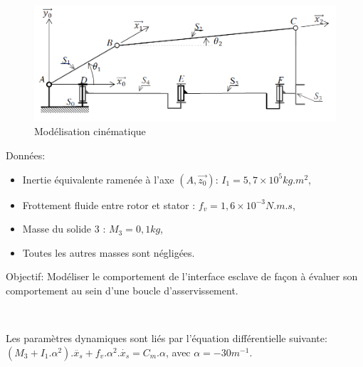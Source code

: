 \begin{figure}[ht!]
\begin{center}
 \includegraphics[width=0.9\linewidth]{img/Figure11}
\end{center}
\caption{Modélisation cinématique}
\label{fig11}
\end{figure}

Données:
\begin{itemize}
 \item Inertie	équivalente	ramenée	à l'axe $(A,\overrightarrow{z_0})$: $I_1=5,7\times 10^{5}kg.m^2$,
 \item Frottement fluide entre rotor et stator : $f_v = 1,6\times 10^{-3} N.m.s$,
 \item Masse du solide 3 : $M_3=0,1kg$,
 \item Toutes les autres masses sont négligées.
\end{itemize}

Objectif: Modéliser le comportement de l'interface esclave de façon à évaluer son comportement au sein d'une boucle d'asservissement.





~\

Les paramètres dynamiques sont liés par l'équation différentielle suivante: \\ $(M_3+I_1.\alpha^2).\ddot{x_s}+f_v.\alpha^2.\dot{x_s}=C_m.\alpha$, avec $\alpha=-30m^{-1}$.


